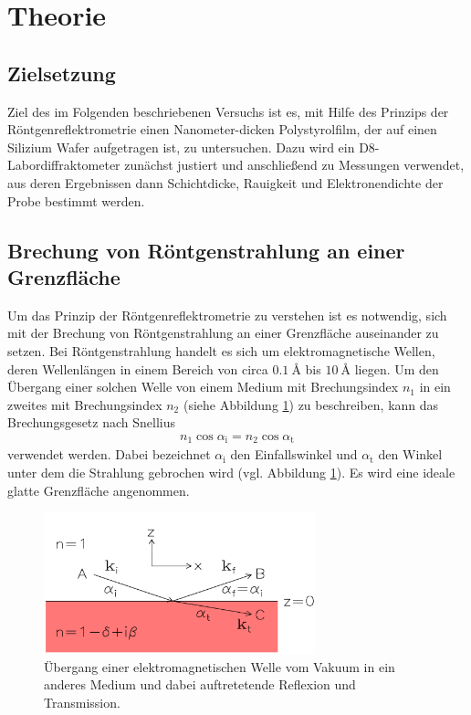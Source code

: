\section{Theorie}
\label{sec:Theorie}

\subsection{Zielsetzung}
\label{subsec:zielsetzung}
Ziel des im Folgenden beschriebenen Versuchs ist es,
mit Hilfe des Prinzips der Röntgenreflektrometrie
einen Nanometer-dicken Polystyrolfilm, der auf einen Silizium
Wafer aufgetragen ist, zu untersuchen.
Dazu wird ein D8-Labordiffraktometer zunächst justiert und anschließend zu
Messungen verwendet, aus deren Ergebnissen dann Schichtdicke, Rauigkeit und
Elektronendichte der Probe bestimmt werden.


\subsection{Brechung von Röntgenstrahlung an einer Grenzfläche}
\label{subsec:einschicht}
Um das Prinzip der Röntgenreflektrometrie zu verstehen ist es notwendig,
sich mit der Brechung von Röntgenstrahlung an einer Grenzfläche auseinander
zu setzen.
Bei Röntgenstrahlung handelt es sich um elektromagnetische Wellen, deren
Wellenlängen in einem Bereich von circa $\SI{0.1}{\angstrom}$ bis
$\SI{10}{\angstrom}$ liegen.
Um den Übergang einer solchen Welle von einem Medium mit Brechungsindex $n_{1}$
in ein zweites mit Brechungsindex $n_{2}$ (siehe Abbildung \ref{fig:einschicht})
zu beschreiben, kann das Brechungsgesetz nach Snellius
\begin{align}
  n_{1} \cos\alpha_{\text{i}} = n_{2} \cos\alpha_{\text{t}}
  \label{eqn:snellius}
\end{align}
verwendet werden. Dabei bezeichnet $\alpha_{\text{i}}$ den Einfallswinkel
und $\alpha_{\text{t}}$ den Winkel unter dem die Strahlung gebrochen wird
(vgl. Abbildung \ref{fig:einschicht}). Es wird eine ideale glatte Grenzfläche
angenommen. \\

\FloatBarrier
\begin{figure}
  \includegraphics[width=0.7\textwidth]{bilder/einschicht.png}
  \caption{Übergang einer elektromagnetischen Welle vom Vakuum in ein
            anderes Medium und dabei auftretetende Reflexion und Transmission.\cite{sample}}
  \label{fig:einschicht}
\end{figure}
\FloatBarrier

